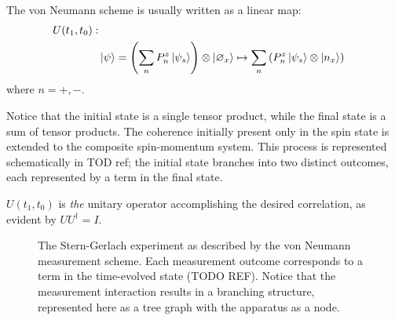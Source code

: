The von Neumann scheme is usually written as a linear map:
\begin{align}
    \nonumber U(t_1, t_0): \\
    & \ket{\psi} = \left(\sum_{n} P^z_n\ket{\psi_s}\right) \otimes \ket{\varnothing_x} \mapsto \sum_{n}\left(P^z_n\ket{\psi_s} \otimes \ket{n_x}\right)
\end{align}
where $n = +, -$.

Notice that the initial state is a single tensor product, while the final state is a sum of tensor products. The coherence initially present only in the spin state is extended to the composite spin-momentum system. This process is represented schematically in TOD ref; the initial state branches into two distinct outcomes, each represented by a term in the final state.

$U(t_1, t_0)$ is \textit{the} unitary operator accomplishing the desired correlation, as evident by $UU^\dagger = I$.

\begin{figure}
\centering\CaptionFontSize
{}

\caption[Insert an abbreviated caption here to show in the List of Figures]
{The Stern-Gerlach experiment as described by the von Neumann measurement scheme. Each measurement outcome corresponds to a term in the time-evolved state (TODO REF). Notice that the measurement interaction results in a branching structure, represented here as a tree graph with the apparatus as a node.}
\label{Figure:Measurement:DetectorStates}
\end{figure}

